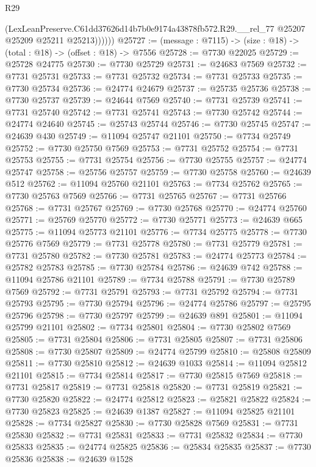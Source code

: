 \begin{lexlean}{R29}
\begin{coremodule}
              (LexLeanPreserve.C61dd37626d14b7b0e9174a43878fb572.R29.__rel_77
                @25207
                @25209
                @25211
                @25213))))))
@25727 := (message : @7115) -> (size : @18) -> (total : @18) -> (offset : @18) -> @7556
@25728 := @7730 @22025
@25729 := @25728 @24775
@25730 := @7730 @25729
@25731 := @24683 @7569
@25732 := @7731 @25731
@25733 := @7731 @25732
@25734 := @7731 @25733
@25735 := @7730 @25734
@25736 := @24774 @24679
@25737 := @25735 @25736
@25738 := @7730 @25737
@25739 := @24644 @7569
@25740 := @7731 @25739
@25741 := @7731 @25740
@25742 := @7731 @25741
@25743 := @7730 @25742
@25744 := @24774 @24640
@25745 := @25743 @25744
@25746 := @7730 @25745
@25747 := @24639 @430
@25749 := @11094 @25747 @21101
@25750 := @7734 @25749
@25752 := @7730 @25750 @7569
@25753 := @7731 @25752
@25754 := @7731 @25753
@25755 := @7731 @25754
@25756 := @7730 @25755
@25757 := @24774 @25747
@25758 := @25756 @25757
@25759 := @7730 @25758
@25760 := @24639 @512
@25762 := @11094 @25760 @21101
@25763 := @7734 @25762
@25765 := @7730 @25763 @7569
@25766 := @7731 @25765
@25767 := @7731 @25766
@25768 := @7731 @25767
@25769 := @7730 @25768
@25770 := @24774 @25760
@25771 := @25769 @25770
@25772 := @7730 @25771
@25773 := @24639 @665
@25775 := @11094 @25773 @21101
@25776 := @7734 @25775
@25778 := @7730 @25776 @7569
@25779 := @7731 @25778
@25780 := @7731 @25779
@25781 := @7731 @25780
@25782 := @7730 @25781
@25783 := @24774 @25773
@25784 := @25782 @25783
@25785 := @7730 @25784
@25786 := @24639 @742
@25788 := @11094 @25786 @21101
@25789 := @7734 @25788
@25791 := @7730 @25789 @7569
@25792 := @7731 @25791
@25793 := @7731 @25792
@25794 := @7731 @25793
@25795 := @7730 @25794
@25796 := @24774 @25786
@25797 := @25795 @25796
@25798 := @7730 @25797
@25799 := @24639 @891
@25801 := @11094 @25799 @21101
@25802 := @7734 @25801
@25804 := @7730 @25802 @7569
@25805 := @7731 @25804
@25806 := @7731 @25805
@25807 := @7731 @25806
@25808 := @7730 @25807
@25809 := @24774 @25799
@25810 := @25808 @25809
@25811 := @7730 @25810
@25812 := @24639 @1033
@25814 := @11094 @25812 @21101
@25815 := @7734 @25814
@25817 := @7730 @25815 @7569
@25818 := @7731 @25817
@25819 := @7731 @25818
@25820 := @7731 @25819
@25821 := @7730 @25820
@25822 := @24774 @25812
@25823 := @25821 @25822
@25824 := @7730 @25823
@25825 := @24639 @1387
@25827 := @11094 @25825 @21101
@25828 := @7734 @25827
@25830 := @7730 @25828 @7569
@25831 := @7731 @25830
@25832 := @7731 @25831
@25833 := @7731 @25832
@25834 := @7730 @25833
@25835 := @24774 @25825
@25836 := @25834 @25835
@25837 := @7730 @25836
@25838 := @24639 @1528

\end{coremodule}
\end{lexlean}
